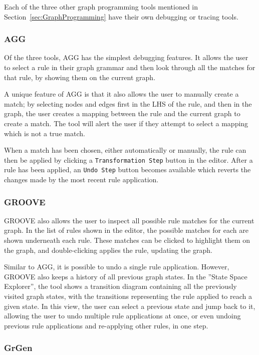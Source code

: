 \documentclass[authoryearcitations]{UoYCSproject}
\begin{document}
Each of the three other graph programming tools mentioned in
Section~\ref{sec:GraphProgramming} have their own debugging or tracing tools.

\subsubsection{AGG}

Of the three tools, AGG has the simplest debugging features. It allows the user to
select a rule in their graph grammar and then look through all the matches for
that rule, by showing them on the current graph.

A unique feature of AGG is that it also allows the user to manually create a
match; by selecting nodes and edges first in the LHS of the rule, and then in
the graph, the user creates a mapping between the rule and the current graph to
create a match. The tool will alert the user if they attempt to select a mapping
which is not a true match.

When a match has been chosen, either automatically or manually, the rule can then
be applied by clicking a \texttt{Transformation Step} button in the editor. After
a rule has been applied, an \texttt{Undo Step} button becomes available which
reverts the changes made by the most recent rule application.

\subsubsection{GROOVE}

GROOVE also allows the user to inspect all possible rule matches for the current
graph. In the list of rules shown in the editor, the possible matches for each are
shown underneath each rule. These matches can be clicked to highlight them on the
graph, and double-clicking applies the rule, updating the graph.

Similar to AGG, it is possible to undo a single rule application. However, GROOVE
also keeps a history of all previous graph states. In the ''State Space Explorer'',
the tool shows a transition diagram containing all the previously visited graph
states, with the transitions representing the rule applied to reach a given state.
In this view, the user can select a previous state and jump back to it, allowing
the user to undo multiple rule applications at once, or even undoing previous rule
applications and re-applying other rules, in one step.

\subsubsection{GrGen}
\end{document}
